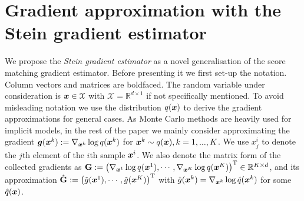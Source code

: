 \section{Gradient approximation with the Stein gradient estimator}
\label{sec:gradient_approximation}

We propose the \emph{Stein gradient estimator} as a novel generalisation of the score matching gradient estimator. Before presenting it we first set-up the notation. Column vectors and matrices are boldfaced. The random variable under consideration is $\bm{x} \in \mathcal{X}$ with $\mathcal{X} = \mathbb{R}^{d \times 1}$ if not specifically mentioned. To avoid misleading notation we use the distribution $q(\bm{x})$ to derive the gradient approximations for general cases. As Monte Carlo methods are heavily used for implicit models, in the rest of the paper we mainly consider approximating the gradient $\bm{g}(\bm{x}^k) :=\nabla_{\bm{x}^k} \log q(\bm{x}^k)$ for $\bm{x}^k \sim q(\bm{x}), k = 1, ..., K$. We use $x^i_j$ to denote the $j$th element of the $i$th sample $\bm{x}^i$. We also denote the matrix form of the collected gradients as
$\mathbf{G} := \left( \nabla_{\bm{x}^1} \log q(\bm{x}^1), \cdots, \nabla_{\bm{x}^K} \log q(\bm{x}^K) \right)^{\text{T}} \in \mathbb{R}^{K \times d}$, and its approximation $\hat{\mathbf{G}} := \left( \hat{g}(\bm{x}^1), \cdots, \hat{g}(\bm{x}^K) \right)^{\text{T}}$ with $\hat{g}(\bm{x}^k) = \nabla_{\bm{x}^k} \log \hat{q}(\bm{x}^k)$ for some $\hat{q}(\bm{x})$.

